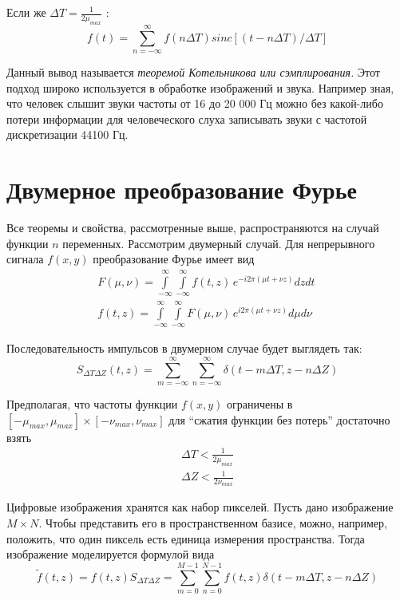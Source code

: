 \documentclass[oneside,final,14pt]{extreport}
\begin{document}
Если же $ \varDelta T = \frac{1}{2 \mu_{max}} $ :
\begin{equation}
f(t) 
=
\sum_{ n = - \infty}^{\infty}
f(n \varDelta T ) 
sinc[ (t - n \varDelta T) / \varDelta T	]  
\end{equation}

Данный вывод называется \textit{теоремой Котельникова или сэмплирования.} 
Этот подход широко используется в обработке изображений и звука. Например зная, что человек слышит звуки частоты от 16 до 20 000 Гц можно без какой-либо потери информации для человеческого слуха записывать звуки с частотой дискретизации 44100 Гц.

\section{Двумерное преобразование Фурье}
Все теоремы и свойства, рассмотренные выше, распространяются на случай функции $n$ переменных. Рассмотрим двумерный случай. Для непрерывного сигнала $f(x,y)$ преобразование Фурье имеет вид
\begin{gather}
\label{FFT_2d}
F(\mu,\nu)
=
\int\limits_{-\infty}^{\infty}
\int\limits_{-\infty}^{\infty}
f(t,z) \,
e^{-i 2 \pi( \mu t + \nu z)}
dz dt~
\\
\label{IFFT_2d}
f(t,z)
=
\int\limits_{-\infty}^{\infty}
\int\limits_{-\infty}^{\infty}
F(\mu,\nu) \,
e^{i 2 \pi( \mu t + \nu z)}
d\mu d\nu~
\end{gather}

Последовательность импульсов в двумерном случае будет выглядеть так:
\begin{equation}
S_{ \varDelta T \varDelta Z }
(t,z)
=
\sum_
{ m = - \infty}^{\infty}
\sum_
{ n = - \infty}^{\infty}
\delta(
t - m \varDelta T,
z - n \varDelta Z
)
\end{equation}

Предполагая, что частоты функции $f(x,y)$ ограничены в $
[- \mu_{max},\mu_{max}] 
\times
[- \nu_{max},\nu_{max}] 
$
для “сжатия функции без потерь” достаточно взять
\begin{gather}
\varDelta T 
<
\frac{1}{2 \mu_{max}}
\\
\varDelta Z 
<
\frac{1}{2 \nu_{max}}
\label{Kotelnicov_imparity}
\end{gather}

Цифровые изображения хранятся как набор пикселей. Пусть дано изображение $M\times N$. Чтобы представить его в пространственном базисе, можно, например, положить, что один пиксель есть единица измерения пространства. Тогда изображение моделируется формулой вида
\begin{equation}
\tilde{f}(t,z) 
=
f(t,z)
S_{ \varDelta T \varDelta Z }
=
\sum_
{ m =  0}^{M-1}
\sum_
{ n =  0}^{N-1}
f(t,z)\delta(
t - m \varDelta T,
z - n \varDelta Z
)
\label{sample_2d}
\end{equation}
\end{document}
